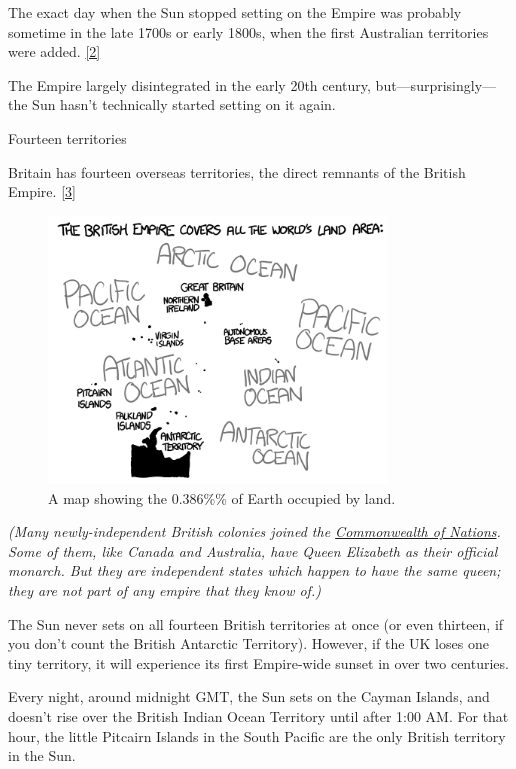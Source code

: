 {{The exact day when the Sun stopped setting on the Empire was probably sometime in the late 1700s or early 1800s, when the first Australian territories were added. \href{http://www.bbc.co.uk/radio4/history/empire/map/}{[2]}}

{The Empire largely disintegrated in the early 20th century, but—surprisingly—the Sun hasn't technically started setting on it again.}

{Fourteen territories}

{Britain has fourteen overseas territories, the direct remnants of the British Empire. \href{http://www.telegraph.co.uk/news/wikileaks-files/london-wikileaks/8305236/A-GUIDE-TO-THE-BRITISH-OVERSEAS-TERRITORIES.html}{[3]}}

\begin{figure}[!htbp]
\centering
\includegraphics[scale=0.5, max width=0.8\textwidth]{imgs/a/48/empire_map.png}
\caption{A map showing the 0.386\%\% of Earth occupied by land.}
\end{figure}

{ \emph{(Many newly-independent British colonies joined the \href{http://en.wikipedia.org/wiki/Commonwealth\_of\_Nations}{Commonwealth of Nations}. Some of them, like Canada and Australia, have Queen Elizabeth as their official monarch. But they are independent states which happen to have the same queen; they are not part of any empire that they know of.)} }

{The Sun never sets on all fourteen British territories at once (or even thirteen, if you don’t count the British Antarctic Territory). However, if the UK loses one tiny territory, it will experience its first Empire-wide sunset in over two centuries.}

{Every night, around midnight GMT, the Sun sets on the Cayman Islands, and doesn't rise over the British Indian Ocean Territory until after 1:00 AM. For that hour, the little Pitcairn Islands in the South Pacific are the only British territory in the Sun.}

}
